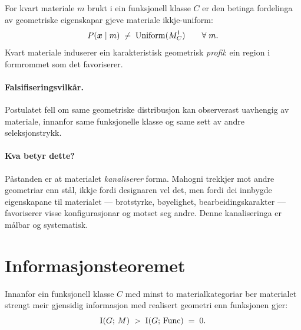 \begin{postmark}\label{post:L.6.1}
For kvart materiale $m$ brukt i ein funksjonell klasse $C$ er den
betinga fordelinga av geometriske eigenskapar gjeve materiale
ikkje-uniform:
\[
  P(\bm{x} \mid m) \;\neq\; \mathrm{Uniform}(M^{\mathsf{I}}_C)
  \qquad \forall\; m.
\]
Kvart materiale induserer ein karakteristisk geometrisk
\emph{profil}: ein region i formrommet som det favoriserer.
\end{postmark}

\paragraph{Falsifiseringsvilkår.}
Postulatet fell om same geometriske distribusjon kan observerast
uavhengig av materiale, innanfor same funksjonelle klasse og
same sett av andre seleksjonstrykk.

\paragraph{Kva betyr dette?}
Påstanden er at materialet \emph{kanaliserer} forma. Mahogni
trekkjer mot andre geometriar enn stål, ikkje fordi designaren
vel det, men fordi dei innbygde eigenskapane til materialet ---
brotstyrke, bøyelighet, bearbeidingskarakter --- favoriserer visse
konfigurasjonar og motset seg andre. Denne kanaliseringa er
målbar og systematisk.


\section{Informasjonsteoremet}

\begin{satmark}[Informasjonsteoremet]\label{thm:L.6.2}
Innanfor ein funksjonell klasse $C$ med minst to materialkategoriar
ber materialet strengt meir gjensidig informasjon med realisert
geometri enn funksjonen gjer:
\[
  \operatorname{I}(G;\, M) \;>\; \operatorname{I}(G;\, \mathrm{Func}) \;=\; 0.
\]
\end{satmark}

